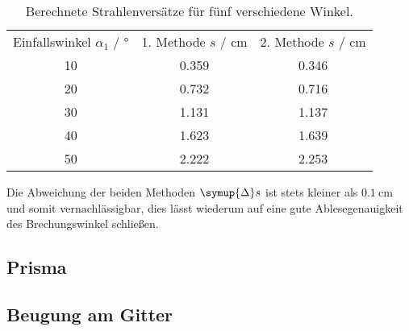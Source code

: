 \begin{table} [H]
    \centering
    \caption{Berechnete Strahlenversätze für fünf verschiedene Winkel.}
    \label{tab:Strahlenversatz}
    \begin{tabular}{S S S}
      \toprule
      {Einfallswinkel $\alpha_1$ / $\unit{\degree}$} & {1. Methode $s$ / $\unit{\centi\meter}$} & {2. Methode $s$ / $\unit{\centi\meter}$} \\
      10 & 0.359 & 0.346 \\
      20 & 0.732 & 0.716 \\
      30 & 1.131 & 1.137 \\
      40 & 1.623 & 1.639 \\
      50 & 2.222 & 2.253 \\
      \bottomrule
    \end{tabular}
\end{table}

Die Abweichung der beiden Methoden $\symup{\Delta}s$ ist stets kleiner als $\qty{0.1}{\centi\meter}$ und somit vernachlässigbar,
dies lässt wiederum auf eine gute Ablesegenauigkeit des Brechungswinkel schließen.

\subsection{Prisma}

\subsection{Beugung am Gitter}